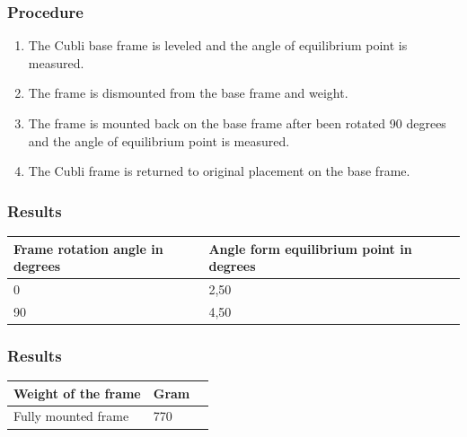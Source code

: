 \subsubsection{Procedure}
\begin{enumerate}
	\item The Cubli base frame is leveled and the angle of equilibrium point is measured.
	\item The frame is dismounted from the base frame and weight.
	\item The frame is mounted back on the base frame after been rotated 90 degrees and the angle of equilibrium point is measured.
	\item The Cubli frame is returned to original placement on the base frame.
\end{enumerate}

\subsubsection{Results}
\begin{table}[H]
	\begin{tabular}{|l|l|p{4.3cm}|}
		\hline%
		\textbf{Frame rotation angle in degrees}       &  \textbf{Angle form equilibrium point in degrees}         \\
		\hline%
		0                                & 2,50           \\
		\hline%
		90							  & 4,50              \\
		\hline%
	\end{tabular}
\end{table}

\subsubsection{Results}
\begin{table}[H]
	\begin{tabular}{|l|l|p{4.3cm}|}
		\hline%
		\textbf{Weight of the frame}       &  \textbf{Gram}         \\
		\hline%
		Fully mounted frame        	  & 770          \\
		\hline%
	\end{tabular}
\end{table}	
